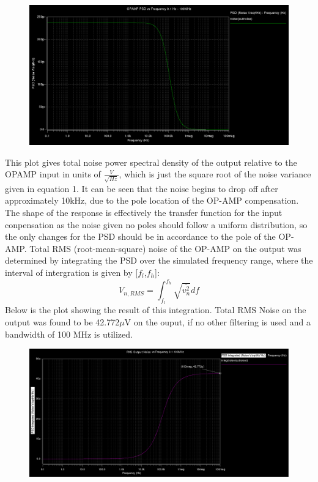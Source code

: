 \documentclass[12pt]{article}
\begin{document}
\FloatBarrier
\begin{figure}[h!]
\begin{center}
 \includegraphics[scale=0.23]{./noise1a.png}
\end{center}
\end{figure}
\FloatBarrier
This plot gives total noise power spectral density of the output relative to the OPAMP input in units of $\frac{V}{\sqrt{Hz}}$, which is just the square root of the noise variance given in equation 1. It can be seen that the noise begins to drop off after approximately 10kHz, due to the pole location of the OP-AMP compensation. The shape of the response is effectively the transfer function for the input conpensation as the noise given no poles should follow a uniform distribution, so the only changes for the PSD should be in accordance to the pole of the OP-AMP. Total RMS (root-mean-square) noise of the OP-AMP on the output was determined by integrating the PSD over the simulated frequency range, where the interval of intergration is given by [${f_l}$,${f_h}$]:
\begin{equation}
V_{n,RMS} = \int _{f_l}^{f_h} \sqrt{\overline{v_n^2}}df
\end{equation}
Below is the plot showing the result of this integration. Total RMS Noise on the output was found to be 42.772$\mu$V on the ouput, if no other filtering is used and a bandwidth of 100 MHz is utilized. 
\FloatBarrier
\begin{figure}[h!]
\begin{center}
 \includegraphics[scale=0.2]{./noise1b.png}
\end{center}
\end{figure}
\FloatBarrier
\end{document}
